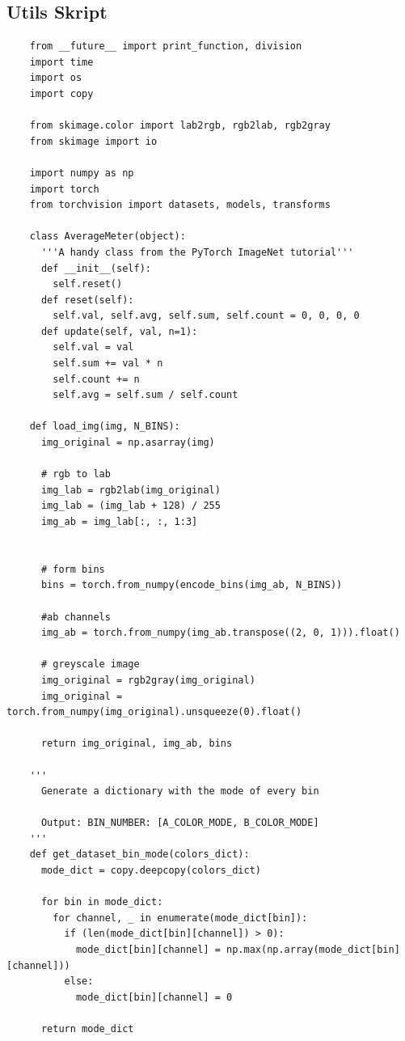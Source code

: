 \subsection{Utils Skript}
\begin{longlisting}
  \begin{verbatim}
    from __future__ import print_function, division
    import time
    import os
    import copy

    from skimage.color import lab2rgb, rgb2lab, rgb2gray
    from skimage import io

    import numpy as np
    import torch
    from torchvision import datasets, models, transforms

    class AverageMeter(object):
      '''A handy class from the PyTorch ImageNet tutorial''' 
      def __init__(self):
        self.reset()
      def reset(self):
        self.val, self.avg, self.sum, self.count = 0, 0, 0, 0
      def update(self, val, n=1):
        self.val = val
        self.sum += val * n
        self.count += n
        self.avg = self.sum / self.count

    def load_img(img, N_BINS):
      img_original = np.asarray(img)
      
      # rgb to lab
      img_lab = rgb2lab(img_original)
      img_lab = (img_lab + 128) / 255
      img_ab = img_lab[:, :, 1:3]

      
      # form bins
      bins = torch.from_numpy(encode_bins(img_ab, N_BINS))

      #ab channels
      img_ab = torch.from_numpy(img_ab.transpose((2, 0, 1))).float()
      
      # greyscale image
      img_original = rgb2gray(img_original)
      img_original = torch.from_numpy(img_original).unsqueeze(0).float()
      
      return img_original, img_ab, bins
        
    '''
      Generate a dictionary with the mode of every bin

      Output: BIN_NUMBER: [A_COLOR_MODE, B_COLOR_MODE] 
    '''
    def get_dataset_bin_mode(colors_dict):
      mode_dict = copy.deepcopy(colors_dict)

      for bin in mode_dict:
        for channel, _ in enumerate(mode_dict[bin]):
          if (len(mode_dict[bin][channel]) > 0):
            mode_dict[bin][channel] = np.max(np.array(mode_dict[bin][channel]))
          else:
            mode_dict[bin][channel] = 0

      return mode_dict


\end{verbatim}
\end{longlisting}
